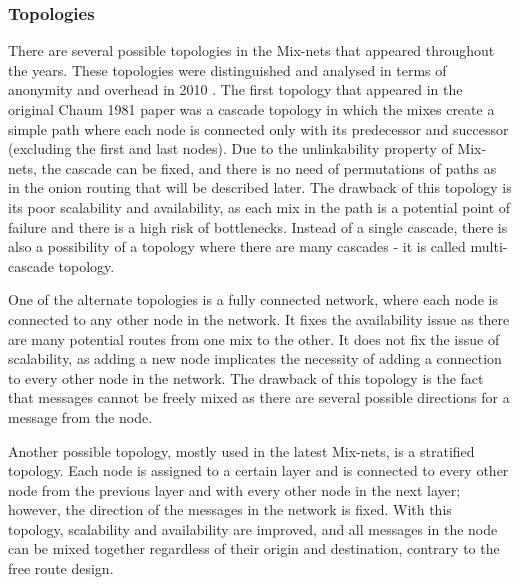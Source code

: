 \subsubsection{Topologies}
There are several possible topologies in the Mix-nets that appeared throughout the years. These topologies were distinguished and analysed in terms of anonymity and overhead in 2010 \cite{topology}. The first topology that appeared in the original Chaum 1981 paper was a cascade topology in which the mixes create a simple path where each node is connected only with its predecessor and successor (excluding the first and last nodes). Due to the unlinkability property of Mix-nets, the cascade can be fixed, and there is no need of permutations of paths as in the onion routing that will be described later. The drawback of this topology is its poor scalability and availability, as each mix in the path is a potential point of failure and there is a high risk of bottlenecks. Instead of a single cascade, there is also a possibility of a topology where there are many cascades - it is called multi-cascade topology.

One of the alternate topologies is a fully connected network, where each node is connected to any other node in the network. It fixes the availability issue as there are many potential routes from one mix to the other. It does not fix the issue of scalability, as adding a new node implicates the necessity of adding a connection to every other node in the network. The drawback of this topology is the fact that messages cannot be freely mixed as there are several possible directions for a message from the node.

Another possible topology, mostly used in the latest Mix-nets, is a stratified topology. Each node is assigned to a certain layer and is connected to every other node from the previous layer and with every other node in the next layer; however, the direction of the messages in the network is fixed. With this topology, scalability and availability are improved, and all messages in the node can be mixed together regardless of their origin and destination, contrary to the free route design.

